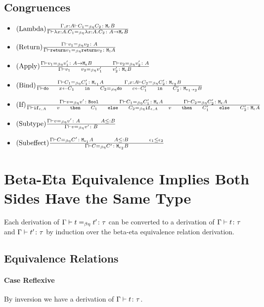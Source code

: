 {    \subsection{Congruences}
    \begin{itemize}
        \item $(\text{Lambda}) \frac{\Gamma, x: A \vdash C_1 =_{\beta\eta} C_2 \colon \texttt{M}_{\epsilon}{B}}{\Gamma \vdash \lambda x : A. C_1 =_{\beta\eta} \lambda x : A. C_2 \colon A \rightarrow \texttt{M}_{\epsilon}{B}}$
        
        \item $(\text{Return}) \frac{\Gamma \vdash v_1 =_{\beta\eta} v_2 \colon A}{\Gamma \vdash \texttt{return} v_1 =_{\beta\eta} \texttt{return} v_2 \colon \texttt{M}_{\texttt{1}}{A}}$
        
        \item $\treerule{Apply}{\gberelation{v_1}{v_1'}{\aeb}\s\s\gberelation{v_2}{v_2'}{A}}{\gberelation{\apply{v_1}{v_2}}{\apply{v_1'}{v_2'}}{\meb}}$
        
        \item $\treerule{Bind}{\gberelation{C_1}{C_1'}{\M{\e_1}{A}} \s\s \berelation{\gax}{C_2}{C_2'}{\M{\e_2}{B}}}{\gberelation{\doin{x}{C_1}{C_2}}{\doin{c}{C_1'}{C_2'}}{\M{\e_1 \dot \e_2}{B}}}$
        
        \item $\treerule{If}{\gberelation{v}{v'}{\B} \s\s \gberelation{C_1}{C_1'}{\mea}\s\s\gberelation{C_2}{C_2'}{\mea}}{\gberelation{\ifthenelse{\e}{A}{v}{C_1}{C_2}}{\ifthenelse{\e}{A}{v}{C_1'}{C_2'}}{\mea}}$
        \item $\treerule{Subtype}{\gberelation{v}{v'}{A} \s\s A \subtype B}{\gberelation{v}{v'}{B}}$
        \item $\treerule{Subeffect}{\gberelation{C}{C'}{\M{\e_1}{A}}\s\s A \subtype B \s\s \e_1 \subeffect \e_2}{\gberelation{C}{C'}{\M{\e_2}{B}}}$
    \end{itemize}
    \section{Beta-Eta Equivalence Implies Both Sides Have the Same Type}
    Each derivation of $\Gamma \vdash t =_{\beta\eta} t' \colon \tau$ can be converted to a derivation of $\Gamma \vdash t \colon \tau$ and $\Gamma \vdash t' \colon \tau$ by induction over the beta-eta equivalence relation derivation.

    \subsection{Equivalence Relations}
    \paragraph{Case Reflexive}
    By inversion we have a derivation of $\Gamma \vdash t \colon \tau$.

}
